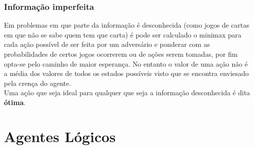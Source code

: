 \documentclass[]{report}
\begin{document}
\subsection{Informação imperfeita}
Em problemas em que parte da informação é desconhecida (como jogos de cartas em que não se sabe quem tem que carta) é pode ser calculado o minimax para cada ação possível de ser feita por um adversário e ponderar com as probabilidades de certos jogos ocorrerem ou de ações serem tomadas, por fim opta-se pelo caminho de maior esperança. No entanto o valor de uma ação não é a média dos valores de todos os estados possíveis visto que se encontra enviesado pela crença do agente.\\
Uma ação que seja ideal para qualquer que seja a informação desconhecida é dita \textbf{ótima}.
\chapter{Agentes Lógicos}
\end{document}
